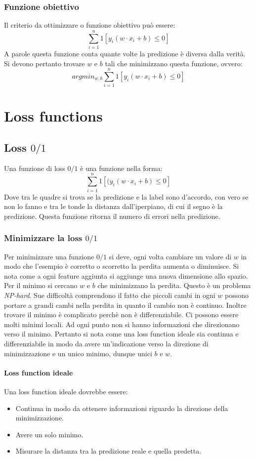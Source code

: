 		\subsubsection{Funzione obiettivo}
		Il criterio da ottimizzare o funzione obiettivo pu\`o essere:
		$$\sum\limits_{i=1}^n1[y_i(w\cdot x_i+b)\le 0]$$
		A parole questa funzione conta quante volte la predizione \`e diversa dalla verit\`a. Si devono pertanto trovare $w$ e $b$ tali che minimizzano questa funzione, ovvero:
		$$argmin_{w,b}\sum\limits_{i=1}^n1[y_i(w\cdot x_i+b)\le 0]$$

\section{Loss functions}

	\subsection{Loss $0/1$}
	Una funzione di loss $0/1$ \`e una funzione nella forma:
	$$\sum\limits_{i=1}^n1[(y_i(w\cdot x_i+b)\le 0]$$
	Dove tra le quadre si trova se la predizione e la label sono d'accordo, con vero se non lo fanno e tra le tonde la distanza dall'iperpiano, di cui il segno \`e la predizione.
	Questa funzione ritorna il numero di errori nella predizione.

		\subsubsection{Minimizzare la loss $0/1$}
		Per minimizzare una funzione $0/1$ si deve, ogni volta cambiare un valore di $w$ in modo che l'esempio \`e corretto o scorretto la perdita aumenta o diminuisce.
		Si nota come a ogni feature aggiunta si aggiunge una nuova dimensione allo spazio.
		Per il minimo si cercano $w$ e $b$ che minimizzano la perdita.
		Questo \`e un problema \emph{NP-hard}.
		Sue difficolt\`a comprendono il fatto che piccoli cambi in ogni $w$ possono portare a grandi cambi nella perdita in quanto il cambio non \`e continuo. Inoltre trovare il minimo \`e complicato perch\`e non \`e differenziabile.
		Ci possono essere molti minimi locali.
		Ad ogni punto non si hanno informazioni che direzionano verso il minimo.
		Pertanto si nota come una loss function ideale sia continua e differenziabile in modo da avere un'indicazione verso la direzione di minimizzazione e un unico minimo, dunque unici $b$ e $w$.

			\paragraph{Loss function ideale}
			Una loss function ideale dovrebbe essere:
			\begin{itemize}
				\item Continua in modo da ottenere informazioni riguardo la direzione della minimizzazione.
				\item Avere un solo minimo.
				\item Misurare la distanza tra la predizione reale e quella predetta.
			\end{itemize}

